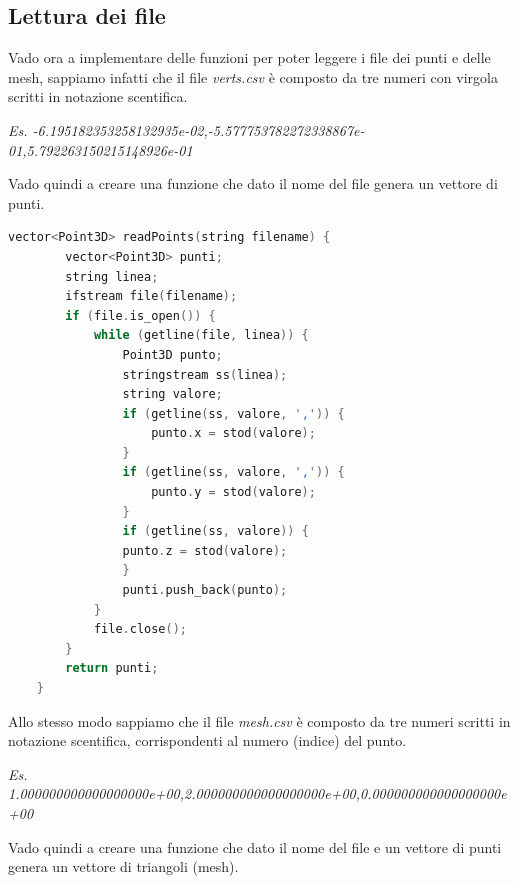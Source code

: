 \documentclass[a4paper]{article}
\begin{document}
\subsection{Lettura dei file}

Vado ora a implementare delle funzioni per poter leggere i file dei punti e delle mesh, sappiamo infatti che il file \emph{verts.csv} è composto da tre numeri con virgola scritti in notazione scentifica.

\vspace{5pt}

\noindent\emph{Es. \footnotesize{-6.195182353258132935e-02,-5.577753782272338867e-01,5.792263150215148926e-01}}

\vspace{7pt}

Vado quindi a creare una funzione che dato il nome del file genera un vettore di punti.

\begin{lstlisting}[language=c++]
    vector<Point3D> readPoints(string filename) {
        vector<Point3D> punti;
        string linea;
        ifstream file(filename);
        if (file.is_open()) {
            while (getline(file, linea)) {
                Point3D punto;
                stringstream ss(linea);
                string valore;
                if (getline(ss, valore, ',')) {
                    punto.x = stod(valore);
                }
                if (getline(ss, valore, ',')) {
                    punto.y = stod(valore);
                }
                if (getline(ss, valore)) {
                punto.z = stod(valore);
                }
                punti.push_back(punto);
            }
            file.close();
        }
        return punti;
    }
\end{lstlisting}

\newpage

Allo stesso modo sappiamo che il file \emph{mesh.csv} è composto da tre numeri scritti in notazione scentifica, corrispondenti al numero (indice) del punto.

\vspace{5pt}

\noindent\emph{Es. \footnotesize{1.000000000000000000e+00,2.000000000000000000e+00,0.000000000000000000e+00}}

\vspace{7pt}

Vado quindi a creare una funzione che dato il nome del file e un vettore di punti genera un vettore di triangoli (mesh).
\end{document}
